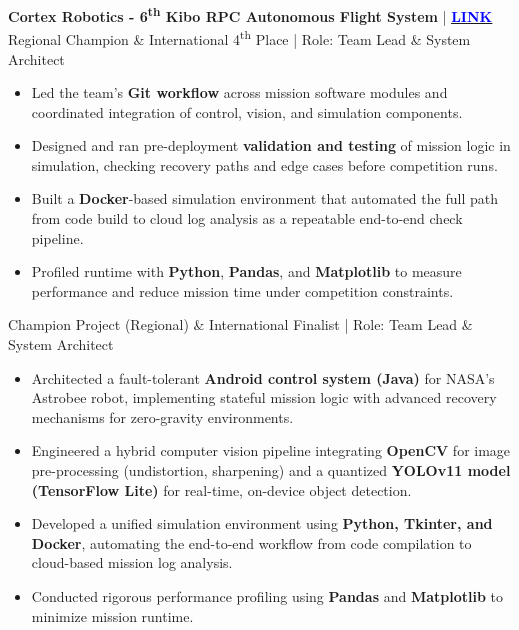 \noindent
{\noindent\fontsize{12pt}{15pt}\bfseries Cortex Robotics - 6\textsuperscript{th} Kibo RPC Autonomous Flight System} | \href{https://humans-in-space.jaxa.jp/en/biz-lab/news/detail/005263.html#:~:text=(2)%20Bangladesh%20%3A%20Cortex%20Robotics}{\bfseries{\underline{\textcolor{blue}{LINK}}}}\\
\ifsqa
{\fontsize{9pt}{11pt}Regional Champion \& International 4\textsuperscript{th} Place | Role: Team Lead \& System Architect}
\begin{itemize}
    \item Led the team's \textbf{Git workflow} across mission software modules and coordinated integration of control, vision, and simulation components.
    \item Designed and ran pre-deployment \textbf{validation and testing} of mission logic in simulation, checking recovery paths and edge cases before competition runs.
    \item Built a \textbf{Docker}-based simulation environment that automated the full path from code build to cloud log analysis as a repeatable end-to-end check pipeline.
    \item Profiled runtime with \textbf{Python}, \textbf{Pandas}, and \textbf{Matplotlib} to measure performance and reduce mission time under competition constraints.
\end{itemize}
\else
{\fontsize{9pt}{11pt}Champion Project (Regional) \& International Finalist | Role: Team Lead \& System Architect}
\begin{itemize}
    \item Architected a fault-tolerant \textbf{Android control system (Java)} for NASA’s Astrobee robot, implementing stateful mission logic with advanced recovery mechanisms for zero-gravity environments.
    \item Engineered a hybrid computer vision pipeline integrating \textbf{OpenCV} for image pre-processing (undistortion, sharpening) and a quantized \textbf{YOLOv11 model (TensorFlow Lite)} for real-time, on-device object detection.
    \item Developed a unified simulation environment using \textbf{Python, Tkinter, and Docker}, automating the end-to-end workflow from code compilation to cloud-based mission log analysis.
    \item Conducted rigorous performance profiling using \textbf{Pandas} and \textbf{Matplotlib} to minimize mission runtime.
\end{itemize}
\fi

